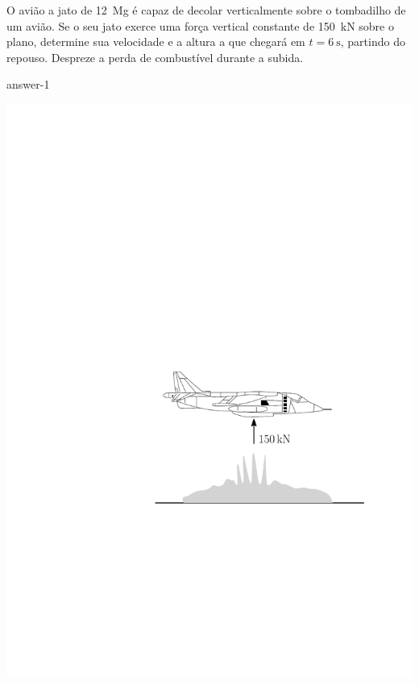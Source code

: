 \item O avião a jato de \SI{12}{\mega\g} é capaz de decolar verticalmente sobre o tombadilho de um avião. Se o seu jato exerce uma força vertical constante de \SI{150}{\kilo\newton} sobre o plano, determine sua velocidade e a altura a que chegará em $t=\SI{6}{\second}$, partindo do repouso. Despreze a perda de combustível durante a subida.

{answer-1}

\vspace{-1.7cm}
\begin{flushright}
	\includegraphics[scale=.8]{images/draw_1}
\end{flushright}